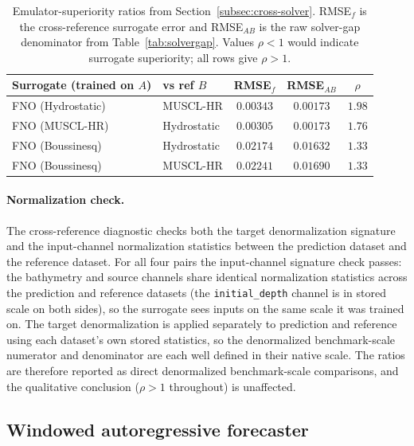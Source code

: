 \begin{table}[!htbp]
\centering
\caption{Emulator-superiority ratios from Section~\ref{subsec:cross-solver}. RMSE$_f$ is the cross-reference surrogate error and RMSE$_{AB}$ is the raw solver-gap denominator from Table~\ref{tab:solvergap}. Values $\rho<1$ would indicate surrogate superiority; all rows give $\rho>1$.}
\label{tab:superiority}
\begin{tabular}{llccc}
    \toprule
    Surrogate (trained on $A$) & vs ref $B$ & RMSE$_{f}$ & RMSE$_{AB}$ & $\rho$ \\
    \midrule
    FNO (Hydrostatic) & MUSCL-HR    & $0.00343$ & $0.00173$ & $1.98$ \\
    FNO (MUSCL-HR)    & Hydrostatic & $0.00305$ & $0.00173$ & $1.76$ \\
    FNO (Boussinesq)  & Hydrostatic & $0.02174$ & $0.01632$ & $1.33$ \\
    FNO (Boussinesq)  & MUSCL-HR    & $0.02241$ & $0.01690$ & $1.33$ \\
    \bottomrule
\end{tabular}
\end{table}

\paragraph{Normalization check.}
The cross-reference diagnostic checks both the target denormalization signature and the input-channel normalization statistics between the prediction dataset and the reference dataset. For all four pairs the input-channel signature check passes: the bathymetry and source channels share identical normalization statistics across the prediction and reference datasets (the \texttt{initial\_depth} channel is in stored scale on both sides), so the surrogate sees inputs on the same scale it was trained on. The target denormalization is applied separately to prediction and reference using each dataset's own stored statistics, so the denormalized benchmark-scale numerator and denominator are each well defined in their native scale. The ratios are therefore reported as direct denormalized benchmark-scale comparisons, and the qualitative conclusion ($\rho>1$ throughout) is unaffected.

\subsection{Windowed autoregressive forecaster}
\label{subsec:res-window}

